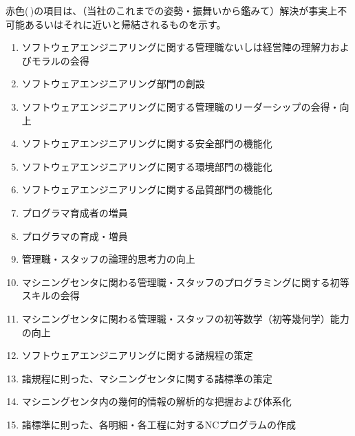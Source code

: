 赤色(\,\sarrow[red]\!)の項目は、（当社のこれまでの姿勢・振舞いから鑑みて）解決が事実上不可能あるいはそれに近いと帰結されるものを示す。
\begin{enumerate}[label=\sarrow]
\item[{\sarrow[red]}] ソフトウェアエンジニアリングに関する管理職ないしは経営陣の理解力およびモラルの会得
\item[{\sarrow[red]}] ソフトウェアエンジニアリング部門の創設
\item[{\sarrow[red]}] ソフトウェアエンジニアリングに関する管理職のリーダーシップの会得・向上
\item[{\sarrow[red]}] ソフトウェアエンジニアリングに関する安全部門の機能化
\item[{\sarrow[red]}] ソフトウェアエンジニアリングに関する環境部門の機能化
\item[{\sarrow[red]}] ソフトウェアエンジニアリングに関する品質部門の機能化
\item[{\sarrow[red]}] プログラマ育成者の増員
\item[{\sarrow[red]}] プログラマの育成・増員
\item[{\sarrow[red]}] 管理職・スタッフの論理的思考力の向上
\item[{\sarrow[red]}] マシニングセンタに関わる管理職・スタッフのプログラミングに関する初等スキルの会得
\item[{\sarrow[red]}] マシニングセンタに関わる管理職・スタッフの初等数学（初等幾何学）能力の向上
\item ソフトウェアエンジニアリングに関する諸規程の策定
\item 諸規程に則った、マシニングセンタに関する諸標準の策定
\item マシニングセンタ内の幾何的情報の解析的な把握および体系化
\item 諸標準に則った、各明細・各工程に対するNCプログラムの作成
\end{enumerate}


